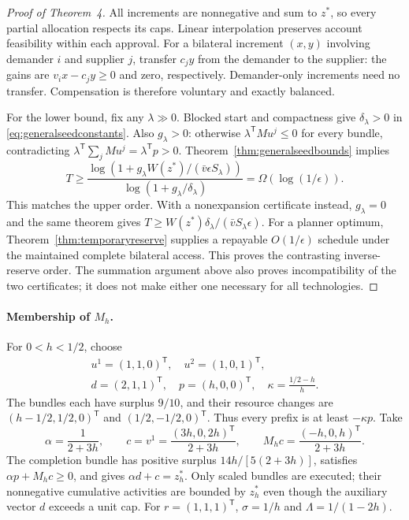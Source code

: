 \documentclass[ecta,draft,supplement]{econsocart}
\theoremstyle{definition}
\theoremstyle{definition}
\begin{document}
\begin{appendix}
\begin{proof}[Proof of Theorem~4%
]
All increments are nonnegative and sum to $z^*$, so every partial allocation
respects its caps. Linear interpolation preserves account feasibility within
each approval. For a bilateral increment $(x,y)$ involving demander $i$ and
supplier $j$, transfer $c_jy$ from the demander to the supplier: the gains
are $v_ix-c_jy\geq0$ and zero, respectively. Demander-only increments need
no transfer. Compensation is therefore voluntary and exactly balanced.

For the lower bound, fix any $\lambda\gg0$. Blocked start and compactness
give $\delta_\lambda>0$ in \eqref{eq:generalseedconstants}. Also
$g_\lambda>0$: otherwise $\lambda^{\mathsf T}Mu^j\leq0$ for every bundle,
contradicting $\lambda^{\mathsf T}\sum_jMu^j=\lambda^{\mathsf T}p>0$.
Theorem~\ref{thm:generalseedbounds} implies
\[
 T\geq
 \frac{\log\!\left(1+
 g_\lambda W(z^*)/(\bar v\epsilon S_\lambda)\right)}
 {\log(1+g_\lambda/\delta_\lambda)}
 =\Omega(\log(1/\epsilon)).
\]
This matches the upper order. With a nonexpansion certificate instead,
$g_\lambda=0$ and the same theorem gives
$T\geq W(z^*)\delta_\lambda/(\bar vS_\lambda\epsilon)$.
For a planner optimum, Theorem~\ref{thm:temporaryreserve} supplies a repayable
$O(1/\epsilon)$ schedule under the maintained complete bilateral access.
This proves the contrasting inverse-reserve order. The summation argument
above also proves incompatibility of the two certificates; it does not
make either one necessary for all technologies.
\end{proof}

\paragraph{Membership of \texorpdfstring{$M_h$}{Mh}.}
For $0<h<1/2$, choose
\[
 \begin{gathered}
 u^1=(1,1,0)^{\mathsf T},\quad u^2=(1,0,1)^{\mathsf T},\\
 d=(2,1,1)^{\mathsf T},\quad p=(h,0,0)^{\mathsf T},\quad
 \kappa=\frac{1/2-h}{h}.
 \end{gathered}
\]
The bundles each have surplus $9/10$, and their resource changes are
$(h-1/2,1/2,0)^{\mathsf T}$ and $(1/2,-1/2,0)^{\mathsf T}$.
Thus every prefix is at least $-\kappa p$. Take
\[
 \alpha=\frac1{2+3h},\qquad
 c=v^1=\frac{(3h,0,2h)^{\mathsf T}}{2+3h},\qquad
 M_hc=\frac{(-h,0,h)^{\mathsf T}}{2+3h}.
\]
The completion bundle has positive surplus $14h/[5(2+3h)]$, satisfies
$\alpha p+M_hc\geq0$, and gives $\alpha d+c=z_h^*$.
Only scaled bundles are executed; their nonnegative cumulative activities
are bounded by $z_h^*$ even though the auxiliary vector $d$ exceeds a unit cap.
For $r=(1,1,1)^{\mathsf T}$, $\sigma=1/h$ and $\Lambda=1/(1-2h)$.


\end{appendix}
\end{document}
